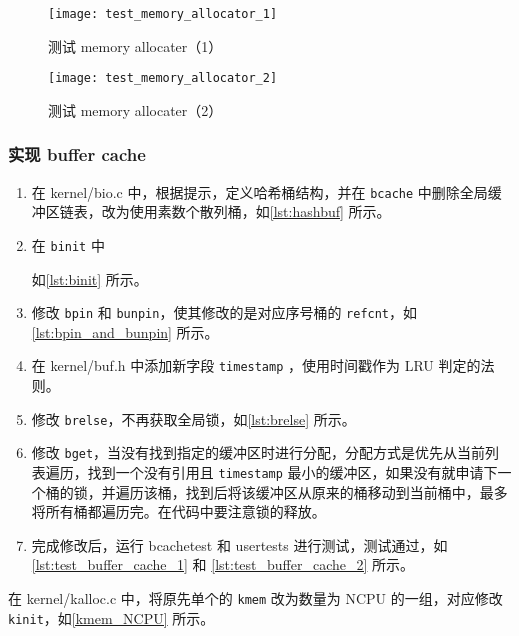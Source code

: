 \begin{figure}[!htb]
	\centering
	\texttt{[image: test\_memory\_allocator\_1]}
	\caption{测试 memory allocater（1）}
	\label{fig:test_memory_allocator_1}
\end{figure}

\begin{figure}[!htb]
	\centering
	\texttt{[image: test\_memory\_allocator\_2]}
	\caption{测试 memory allocater（2）}
	\label{fig:test_memory_allocator_2}
\end{figure}

\subsubsection{实现 buffer cache}

\begin{enumerate}
	\item 在 kernel/bio.c 中，根据提示，定义哈希桶结构，并在 \texttt{bcache} 中删除全局缓冲区链表，改为使用素数个散列桶，如\cref{lst:hashbuf} 所示。 
	\item 在 \texttt{binit} 中 
	如\cref{lst:binit} 所示。
	\item 修改 \texttt{bpin} 和 \texttt{bunpin}，使其修改的是对应序号桶的 \texttt{refcnt}，如\cref{lst:bpin_and_bunpin} 所示。
	\item 在 kernel/buf.h 中添加新字段 \texttt{timestamp} ，使用时间戳作为 LRU 判定的法则。
	\item 修改 \texttt{brelse}，不再获取全局锁，如\cref{lst:brelse} 所示。
	\item 修改 \texttt{bget}，当没有找到指定的缓冲区时进行分配，分配方式是优先从当前列表遍历，找到一个没有引用且 \texttt{timestamp} 最小的缓冲区，如果没有就申请下一个桶的锁，并遍历该桶，找到后将该缓冲区从原来的桶移动到当前桶中，最多将所有桶都遍历完。在代码中要注意锁的释放。
	\item 完成修改后，运行 bcachetest 和 usertests 进行测试，测试通过，如\cref{lst:test_buffer_cache_1} 和 \cref{lst:test_buffer_cache_2} 所示。
\end{enumerate}

在 kernel/kalloc.c 中，将原先单个的 \texttt{kmem} 改为数量为 NCPU 的一组，对应修改 \texttt{kinit}，如\cref{kmem_NCPU} 所示。 


